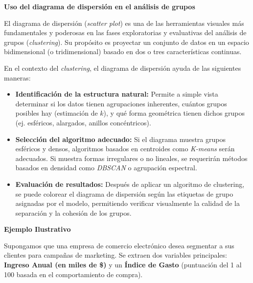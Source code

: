 \textbf{Uso del diagrama de dispersión en el análisis de grupos}

El diagrama de dispersión (\textit{scatter plot}) es una de las herramientas visuales más fundamentales y poderosas en las fases exploratorias y evaluativas del análisis de grupos (\textit{clustering}). Su propósito es proyectar un conjunto de datos en un espacio bidimensional (o tridimensional) basado en dos o tres características continuas. 

En el contexto del \textit{clustering}, el diagrama de dispersión ayuda de las siguientes maneras:
\begin{itemize}
    \item \textbf{Identificación de la estructura natural:} Permite a simple vista determinar si los datos tienen agrupaciones inherentes, cuántos grupos posibles hay (estimación de $k$), y qué forma geométrica tienen dichos grupos (ej. esféricos, alargados, anillos concéntricos).
    \item \textbf{Selección del algoritmo adecuado:} Si el diagrama muestra grupos esféricos y densos, algoritmos basados en centroides como \textit{K-means} serán adecuados. Si muestra formas irregulares o no lineales, se requerirán métodos basados en densidad como \textit{DBSCAN} o agrupación espectral.
    \item \textbf{Evaluación de resultados:} Después de aplicar un algoritmo de clustering, se puede colorear el diagrama de dispersión según las etiquetas de grupo asignadas por el modelo, permitiendo verificar visualmente la calidad de la separación y la cohesión de los grupos.
\end{itemize}

\textbf{Ejemplo Ilustrativo}

Supongamos que una empresa de comercio electrónico desea segmentar a sus clientes para campañas de marketing. Se extraen dos variables principales: \textbf{Ingreso Anual (en miles de \$)} y un \textbf{Índice de Gasto} (puntuación del 1 al 100 basada en el comportamiento de compra).

